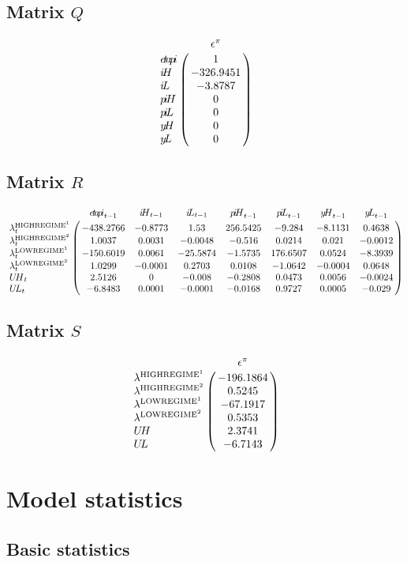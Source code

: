 \subsection*{Matrix $Q$}

$$\bordermatrix{
~ & \epsilon^{\pi} \cr
{e\!t\!a\!p\!i} & 1 \cr
{i\!H} & -326.9451 \cr
{i\!L} & -3.8787 \cr
{p\!i\!H} & 0 \cr
{p\!i\!L} & 0 \cr
{y\!H} & 0 \cr
{y\!L} & 0 \cr
}$$

\subsection*{Matrix $R$}

$$\bordermatrix{
~ & {e\!t\!a\!p\!i}_{t-1} & {i\!H}_{t-1} & {i\!L}_{t-1} & {p\!i\!H}_{t-1} & {p\!i\!L}_{t-1} & {y\!H}_{t-1} & {y\!L}_{t-1} \cr
\lambda^{\mathrm{HIGHREGIME}^{\mathrm{1}}}_{t} & -438.2766 & -0.8773 & 1.53 & 256.5425 & -9.284 & -8.1131 & 0.4638 \cr
\lambda^{\mathrm{HIGHREGIME}^{\mathrm{2}}}_{t} & 1.0037 & 0.0031 & -0.0048 & -0.516 & 0.0214 & 0.021 & -0.0012 \cr
\lambda^{\mathrm{LOWREGIME}^{\mathrm{1}}}_{t} & -150.6019 & 0.0061 & -25.5874 & -1.5735 & 176.6507 & 0.0524 & -8.3939 \cr
\lambda^{\mathrm{LOWREGIME}^{\mathrm{2}}}_{t} & 1.0299 & -0.0001 & 0.2703 & 0.0108 & -1.0642 & -0.0004 & 0.0648 \cr
{U\!H}_{t} & 2.5126 & 0 & -0.008 & -0.2808 & 0.0473 & 0.0056 & -0.0024 \cr
{U\!L}_{t} & -6.8483 & 0.0001 & -0.0001 & -0.0168 & 0.9727 & 0.0005 & -0.029 \cr
}$$

\subsection*{Matrix $S$}

$$\bordermatrix{
~ & \epsilon^{\pi} \cr
\lambda^{\mathrm{HIGHREGIME}^{\mathrm{1}}} & -196.1864 \cr
\lambda^{\mathrm{HIGHREGIME}^{\mathrm{2}}} & 0.5245 \cr
\lambda^{\mathrm{LOWREGIME}^{\mathrm{1}}} & -67.1917 \cr
\lambda^{\mathrm{LOWREGIME}^{\mathrm{2}}} & 0.5353 \cr
{U\!H} & 2.3741 \cr
{U\!L} & -6.7143 \cr
}$$


\section{Model statistics}

\subsection{Basic statistics}

